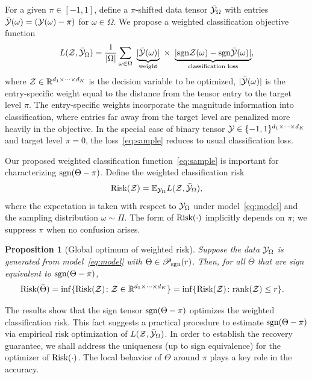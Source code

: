 \documentclass{article}
\theoremstyle{plain}
\newtheorem{prop}{Proposition}
\theoremstyle{definition}
\newcommand*{\KeepStyleUnderBrace}[1]{%
  \mathop{%
    \mathchoice
    {\underbrace{\displaystyle#1}}%
    {\underbrace{\textstyle#1}}%
    {\underbrace{\scriptstyle#1}}%
    {\underbrace{\scriptscriptstyle#1}}%
  }\limits
}
\def\sign{\textup{sgn}}
\def\caliP{\mathscr{P}_{\textup{sgn}}}
\def\risk{\textup{Risk}}
\begin{document}
For a given $\pi \in [-1,1]$, define a $\pi$-shifted data tensor $\bar {\mathcal{Y}}_\Omega$ with entries $\bar {\mathcal{Y}}(\omega) = (\mathcal{Y}(\omega)-\pi)$ for $\omega\in \Omega$. We propose a weighted classification objective function
\begin{equation}\label{eq:sample}
L(\tZ, \bar \tY_\Omega)= {1\over |\Omega|}\sum_{\omega \in \Omega}\ \KeepStyleUnderBrace{|\bar \tY(\omega)|}_{\text{weight}}\  \times \ \KeepStyleUnderBrace{| \sign \tZ(\omega)-\sign \bar \tY(\omega)|}_{\text{classification loss}},
\end{equation}
where $\mathcal{Z}\in\mathbb{R}^{d_1\times \cdots \times d_K}$ is the decision variable to be optimized, $|\bar {\mathcal{Y}}(\omega)|$ is the entry-specific weight equal to the distance from the tensor entry to the target level $\pi$. The entry-specific weights incorporate the magnitude information into classification, where entries far away from the target level are penalized more heavily in the objective. In the special case of binary tensor $\mathcal{Y}\in\{-1,1\}^{d_1\times\cdots\times d_K}$ and target level $\pi=0$, the loss~\eqref{eq:sample} reduces to usual classification loss. 

Our proposed weighted classification function~\eqref{eq:sample} is important for characterizing $\sign(\Theta-\pi)$. Define the weighted classification risk 
\begin{equation}\label{eq:population}
\textup{Risk}(\mathcal{Z})=\mathbb{E}_{\mathcal{Y}_\Omega}L(\mathcal{Z},\bar{\mathcal{Y}}_\Omega),
\end{equation}
where the expectation is taken with respect to $\mathcal{Y}_\Omega$ under model~\eqref{eq:model} and the sampling distribution $\omega\sim\Pi$. %
The form of $\textup{Risk}(\cdot)$ implicitly depends on $\pi$; we suppress $\pi$ when no confusion arises. 
\begin{prop}[Global optimum of weighted risk]\label{prop:global}
Suppose the data $\mathcal{Y}_\Omega$ is generated from model~\eqref{eq:model} with $\Theta \in \caliP(r)$. Then, for all $\bar \Theta$ that are sign equivalent to $\sign(\Theta-\pi)$, 
\begin{align}\label{eq:optimal}
\textup{Risk}(\bar \Theta )&=\inf\{\textup{Risk}(\mathcal{Z})\colon \mathcal{Z}\in\mathbb{R}^{d_1\times \cdots \times d_K}\}
=\inf\{\textup{Risk}(\mathcal{Z})\colon \textup{rank} (\mathcal{Z})\leq r\}.
\end{align}
\end{prop}
The results show that the sign tensor $\sign(\Theta-\pi)$ optimizes the weighted classification risk. This fact suggests a practical procedure to estimate $\sign(\Theta-\pi)$ via empirical risk optimization of $L(\mathcal{Z},\bar {\mathcal{Y}}_\Omega)$. In order to establish the recovery guarantee, we shall address the uniqueness (up to sign equivalence) for the optimizer of $\risk(\cdot)$. The local behavior of $\Theta$ around $\pi$ plays a key role in the accuracy. 
\end{document}
